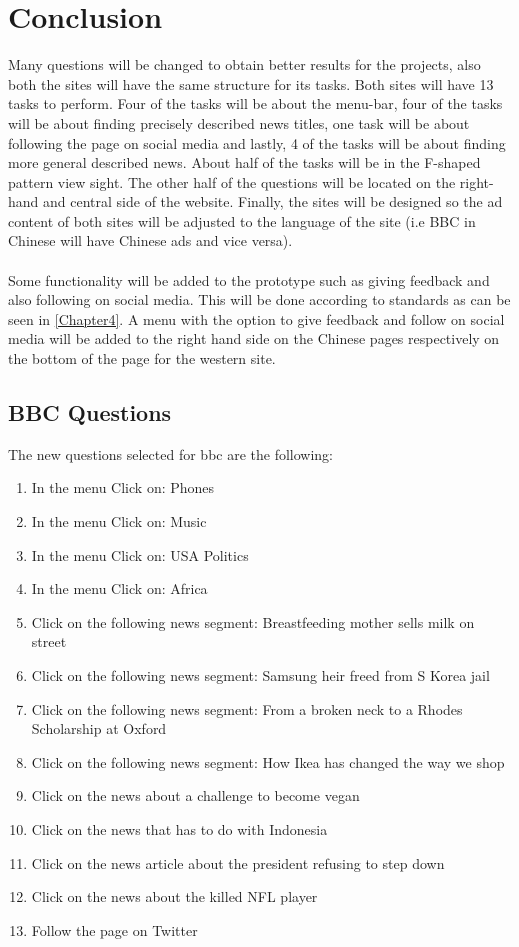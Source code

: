 \section{Conclusion}
Many questions will be changed to obtain better results for the projects, also both the sites will have the same structure for its tasks. Both sites will have 13 tasks to perform. Four of the tasks will be about the menu-bar, four of the tasks will be about finding precisely described news titles, one task will be about following the page on social media and lastly, 4 of the tasks will be about finding more general described news. About half of the tasks will be in the F-shaped pattern view sight. The other half of the questions will be located on the right-hand and central side of the website. Finally, the sites will be designed so the ad content of both sites will be adjusted to the language of the site (i.e BBC in Chinese will have Chinese ads and vice versa). 
\\\\
Some functionality will be added to the prototype such as giving feedback and also following on social media. This will be done according to standards as can be seen in \ref{Chapter4}. A menu with the option to give feedback and follow on social media will be added to the right hand side on the Chinese pages respectively on the bottom of the page for the western site.

\subsection{BBC Questions}
The new questions selected for bbc are the following:
\begin{enumerate}
\item In the menu Click on: Phones
\item In the menu Click on: Music
\item In the menu Click on: USA Politics
\item In the menu Click on: Africa
\item Click on the following news segment: Breastfeeding mother sells milk on street
\item Click on the following news segment: Samsung heir freed from S Korea jail
\item Click on the following news segment: From a broken neck to a Rhodes Scholarship at Oxford
\item Click on the following news segment: How Ikea has changed the way we shop
\item Click on the news about a challenge to become vegan
\item Click on the news that has to do with Indonesia
\item Click on the news article about the president refusing to step down
\item Click on the news about the killed NFL player
\item Follow the page on Twitter
\end{enumerate}
